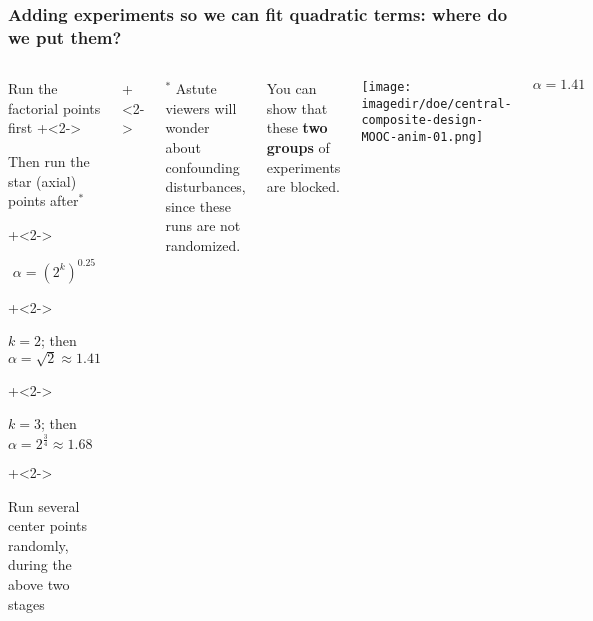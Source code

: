 \documentclass[handout,11pt,aspectratio=169,mathserif]{beamer}
\begin{document}
\begin{frame}\frametitle{Adding experiments so we can fit quadratic terms: where do we put them?}
	\begin{columns}[T]
		
			\vspace{1cm}
			
			\begin{itemize}
				\item	Run the factorial points first
				\onslide+<2->{
					\item	Then run the star (axial) points after$^\ast$
				}
				\onslide+<2->{
					\Large
					\[\alpha  = \left(2^k\right)^{0.25}\]
					
			
					\begin{itemize}
						\onslide+<2->{\item	$k = 2$; then $\alpha = \sqrt{2} \approx 1.41$ }
						\onslide+<2->{\item	$k = 3$; then $\alpha = 2^{\tfrac{3}{4}} \approx 1.68$}
					\end{itemize}
					\normalsize
				}
				\onslide+<2->{
					\item	Run several center points randomly, during the above two stages
				}
			\end{itemize}
			
			\onslide+<2->{
				\vspace{0cm}
				\tiny
				$^\ast$ Astute viewers will wonder about confounding disturbances, since these runs are not randomized.
			
				You can show that these {\color[rgb]{0,0.5,1}\textbf{two}} {\color[rgb]{0.5,0, 0.5}\textbf{groups}} of experiments are blocked.
			}
			
			
			\centerline{\texttt{[image: \\imagedir/doe/central-composite-design-MOOC-anim-01.png]}}
			
			\vspace{-0.5cm}
			\[\alpha = 1.41\]
	\end{columns}
\end{frame}
\end{document}
